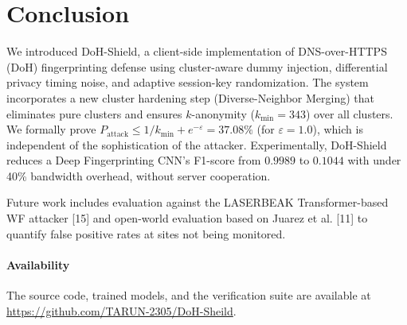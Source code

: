\documentclass[conference]{IEEEtran}
\begin{document}
\section{Conclusion}\label{sec:conclusion}
We introduced DoH-Shield, a client-side implementation of DNS-over-HTTPS (DoH) fingerprinting defense using cluster-aware dummy injection, differential privacy timing noise, and adaptive session-key randomization. The system incorporates a new cluster hardening step (Diverse-Neighbor Merging) that eliminates pure clusters and ensures $k$-anonymity ($k_{\min}=343$) over all clusters. We formally prove $P_{\text{attack}} \le 1/k_{\min} + e^{-\varepsilon} = 37.08\%$ (for $\varepsilon=1.0$), which is independent of the sophistication of the attacker. Experimentally, DoH-Shield reduces a Deep Fingerprinting CNN's F1-score from $0.9989$ to $0.1044$ with under 40\% bandwidth overhead, without server cooperation.

Future work includes evaluation against the LASERBEAK Transformer-based WF attacker [15] and open-world evaluation based on Juarez et al. [11] to quantify false positive rates at sites not being monitored.

\paragraph{Availability} The source code, trained models, and the verification suite are available at \url{https://github.com/TARUN-2305/DoH-Sheild}.
\end{document}
